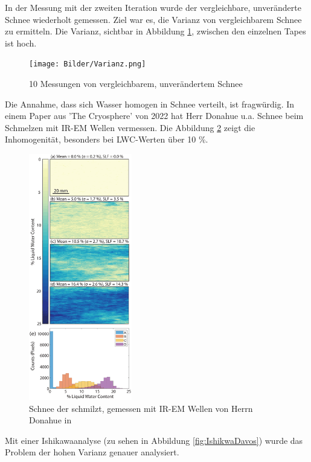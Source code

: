 In der Messung mit der zweiten Iteration wurde der vergleichbare, unveränderte Schnee wiederholt gemessen. Ziel war es, die Varianz von vergleichbarem Schnee zu ermitteln. Die Varianz, sichtbar in Abbildung \ref{fig:Varianz}, zwischen den einzelnen Tapes ist hoch.

\begin{figure}[H]
    \centering
    \texttt{[image: Bilder/Varianz.png]}
    \caption{10 Messungen von vergleichbarem, unverändertem Schnee}
    \label{fig:Varianz}
\end{figure}


Die Annahme, dass sich Wasser homogen in Schnee verteilt, ist fragwürdig. In einem Paper aus 'The Cryosphere' von 2022 \cite{Donahue.2022} hat Herr Donahue u.a. Schnee beim Schmelzen mit IR-EM Wellen vermessen. Die Abbildung \ref{fig:IRPaper} zeigt die Inhomogenität, besonders bei LWC-Werten über 10 \%.

\begin{figure}[H]
    \centering
    \includegraphics[width=0.4\textwidth]{Bilder/tc-16-43-2022-f08-thumb.png}
    \caption{Schnee der schmilzt, gemessen mit IR-EM Wellen von Herrn Donahue in \cite{Donahue.2022}}
    \label{fig:IRPaper}
\end{figure}



Mit einer Ishikawaanalyse (zu sehen in Abbildung \ref{fig:IshikwaDavos}) wurde das Problem der hohen Varianz genauer analysiert.


